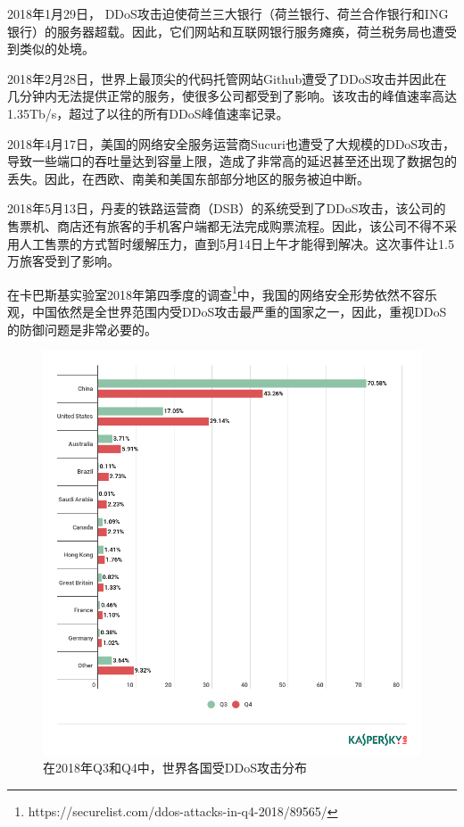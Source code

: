2018年1月29日， DDoS攻击迫使荷兰三大银行（荷兰银行、荷兰合作银行和ING银行）的服务器超载。因此，它们网站和互联网银行服务瘫痪，荷兰税务局也遭受到类似的处境。

2018年2月28日，世界上最顶尖的代码托管网站Github遭受了DDoS攻击并因此在几分钟内无法提供正常的服务，使很多公司都受到了影响。该攻击的峰值速率高达1.35Tb/s，超过了以往的所有DDoS峰值速率记录。

2018年4月17日，美国的网络安全服务运营商Sucuri也遭受了大规模的DDoS攻击，导致一些端口的吞吐量达到容量上限，造成了非常高的延迟甚至还出现了数据包的丢失。因此，在西欧、南美和美国东部部分地区的服务被迫中断。

2018年5月13日，丹麦的铁路运营商（DSB）的系统受到了DDoS攻击，该公司的售票机、商店还有旅客的手机客户端都无法完成购票流程。因此，该公司不得不采用人工售票的方式暂时缓解压力，直到5月14日上午才能得到解决。这次事件让1.5万旅客受到了影响。

在卡巴斯基实验室2018年第四季度的调查\footnote{https://securelist.com/ddos-attacks-in-q4-2018/89565/}中，我国的网络安全形势依然不容乐观，中国依然是全世界范围内受DDoS攻击最严重的国家之一，因此，重视DDoS的防御问题是非常必要的。

\begin{figure}
    \centering
    \includegraphics[scale=0.5]{figures/en-ddos-by-countries.png}
    \caption{在2018年Q3和Q4中，世界各国受DDoS攻击分布}
    \label{fig:ddos_countries}
\end{figure}

